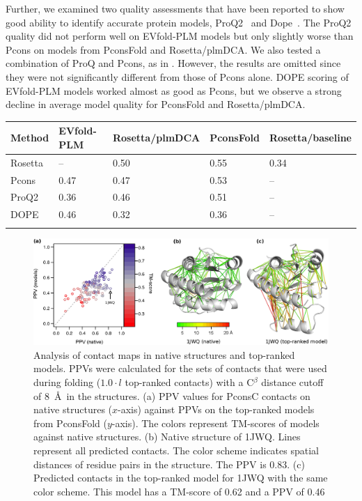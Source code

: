 \documentclass{bioinfo}
\begin{document}
Further, we examined two quality assessments that have been reported
to show good ability to identify accurate protein models, ProQ2~\cite[]{ray_improved_2012} and Dope~\cite[]{Shen17075131}.
The ProQ2 quality did not perform well on EVfold-PLM models but only slightly worse than
Pcons on models from PconsFold and Rosetta/plmDCA. We also tested a
combination of ProQ and Pcons, as in \cite{wallner_pcons.net:_2007}. However, the results are omitted
since they were not significantly different from those of Pcons
alone. DOPE scoring of EVfold-PLM models worked almost as good as Pcons,
but we observe a strong decline in average model quality for PconsFold
and Rosetta/plmDCA. 

\begin{table}[!t]
{\begin{tabular}{lllll}\toprule
        Method & EVfold-PLM & Rosetta/plmDCA & PconsFold & Rosetta/baseline  \\ \midrule
        Rosetta & -- & 0.50 & 0.55 & 0.34 \\
        Pcons & 0.47 & 0.47 & 0.53 & -- \\
        ProQ2 & 0.36 & 0.46 & 0.51 & -- \\
        DOPE & 0.46 & 0.32 & 0.36 & -- \\ \botrule
\end{tabular}}{}
\end{table}

\begin{figure}[!tpb]%
\centerline{\includegraphics[scale=0.7]{figures/qa.eps}}
\caption{Analysis of contact maps in native structures and
top-ranked models. PPVs were calculated for the sets of contacts that
were used during folding ($1.0 \cdot l$ top-ranked contacts) with a
C$^\beta$ distance cutoff of 8~\AA\ in the structures. (a) PPV values for PconsC contacts on native structures 
($x$-axis) against PPVs on the top-ranked models from PconsFold 
($y$-axis). The colors represent TM-scores of models against native
structures. (b) Native structure of 1JWQ. Lines represent all predicted contacts. The color 
scheme indicates spatial distances of residue pairs in the 
structure. The PPV is 0.83. (c) Predicted contacts in the top-ranked 
model for 1JWQ with the same color scheme. This model has a TM-score 
of 0.62 and a PPV of 0.46}\label{fig:qa}
\end{figure}
\end{document}
